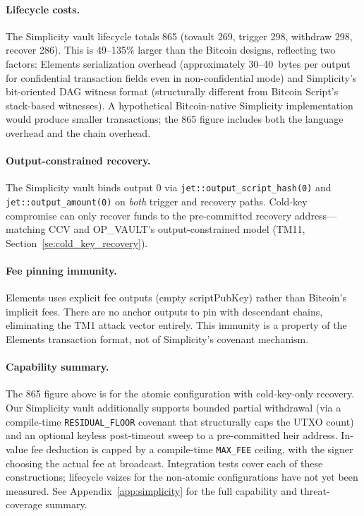 \paragraph{Lifecycle costs.}
The Simplicity vault lifecycle totals 865\vB{} (tovault 269, trigger 298, withdraw
298, recover 286). This is 49--135\% larger than the Bitcoin designs, reflecting
two factors: Elements serialization overhead (approximately 30--40~bytes per output
for confidential transaction fields even in non-confidential mode) and Simplicity's
bit-oriented DAG witness format (structurally different from Bitcoin Script's
stack-based witnesses). A hypothetical Bitcoin-native Simplicity implementation
would produce smaller transactions; the 865\vB{} figure includes both the language
overhead and the chain overhead.

\paragraph{Output-constrained recovery.}
The Simplicity vault binds output 0 via
\texttt{jet::output\_script\_hash(0)} and \texttt{jet::output\_amount(0)} on
\emph{both} trigger and recovery paths. Cold-key compromise can only recover
funds to the pre-committed recovery address---matching CCV and OP\_VAULT's
output-constrained model (TM11, Section~\ref{se:cold_key_recovery}).

\paragraph{Fee pinning immunity.}
Elements uses explicit fee outputs (empty scriptPubKey) rather than Bitcoin's implicit
fees. There are no anchor outputs to pin with descendant chains, eliminating the
TM1 attack vector entirely. This immunity is a property of the Elements transaction
format, not of Simplicity's covenant mechanism.

\paragraph{Capability summary.}
The 865\vB{} figure above is for the atomic configuration with cold-key-only
recovery. Our Simplicity vault additionally supports bounded partial withdrawal
(via a compile-time \texttt{RESIDUAL\_FLOOR} covenant that structurally caps
the UTXO count) and an optional keyless post-timeout sweep to a pre-committed
heir address. In-value fee deduction is capped by a compile-time
\texttt{MAX\_FEE} ceiling, with the signer choosing the actual fee at broadcast.
Integration tests cover each of these constructions; lifecycle vsizes for the
non-atomic configurations have not yet been measured. See
Appendix~\ref{app:simplicity} for the full capability and threat-coverage
summary.
